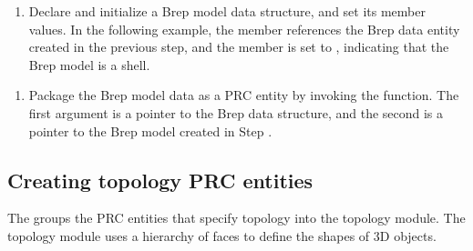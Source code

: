 \documentclass[letterpaper,12pt,english,openany,oneside]{sphinxmanual}
\begin{document}
\begin{sphinxVerbatim}[commandchars=\\\{\}]
   
\end{sphinxVerbatim}
\begin{enumerate}
%
\setcounter{enumi}{2}
\item {} 
Declare and initialize a Brep model data structure, and set its member values. In the following example, the  member references the Brep data entity created in the previous step, and the  member is set to , indicating that the Brep model is a shell.

\end{enumerate}

\begin{sphinxVerbatim}[commandchars=\\\{\}]
 
  
  
\end{sphinxVerbatim}
\begin{enumerate}
%
\setcounter{enumi}{3}
\item {} 
Package the Brep model data as a PRC entity by invoking the  function. The first argument is a pointer to the Brep data structure, and the second is a pointer to the Brep model created in Step .

\end{enumerate}

\begin{sphinxVerbatim}[commandchars=\\\{\}]
  
\end{sphinxVerbatim}


\subsection{Creating topology PRC entities}
\label{\detokenize{Plugins_A3D_API:creating-topology-prc-entities}}
The  groups the PRC entities that specify topology into the topology module. The topology module uses a hierarchy of faces to define the shapes of 3D objects.
\end{document}
